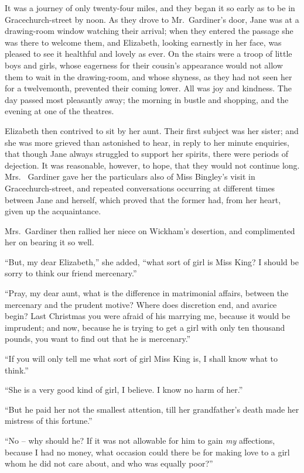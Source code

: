 It was a journey of only twenty-four miles, and they
began it so early as to be in Gracechurch-street by noon.
As they drove to Mr.\ Gardiner’s door, Jane was at a
drawing-room window watching their arrival; when they
entered the passage she was there to welcome them, and
Elizabeth, looking earnestly in her face, was pleased to see
it healthful and lovely as ever. On the stairs were a troop of
little boys and girls, whose eagerness for their cousin’s
appearance would not allow them to wait in the drawing-room,
and whose shyness, as they had not seen her for a
twelvemonth, prevented their coming lower. All was joy
and kindness. The day passed most pleasantly away;
the morning in bustle and shopping, and the evening at
one of the theatres.

Elizabeth then contrived to sit by her aunt. Their
first subject was her sister; and she was more grieved
than astonished to hear, in reply to her minute enquiries,
that though Jane always struggled to support her spirits,
there were periods of dejection. It was reasonable, however,
to hope, that they would not continue long. Mrs.\ %
Gardiner gave her the particulars also of Miss Bingley’s
visit in Gracechurch-street, and repeated conversations
occurring at different times between Jane and herself,
which proved that the former had, from her heart, given
up the acquaintance.

Mrs.\ Gardiner then rallied her niece on Wickham’s
desertion, and complimented her on bearing it so well.

“But, my dear Elizabeth,” she added, “what sort of
girl is Miss King? I should be sorry to think our friend
mercenary.”

“Pray, my dear aunt, what is the difference in matrimonial
affairs, between the mercenary and the prudent
motive? Where does discretion end, and avarice begin?
Last Christmas you were afraid of his marrying me,
because it would be imprudent; and now, because he is
trying to get a girl with only ten thousand pounds, you
want to find out that he is mercenary.”

“If you will only tell me what sort of girl Miss King is,
I shall know what to think.”

“She is a very good kind of girl, I believe. I know no
harm of her.”

“But he paid her not the smallest attention, till her
grandfather’s death made her mistress of this fortune.”

“No -- why should he? If it was not allowable for
him to gain \textit{my} affections, because I had no money, what
occasion could there be for making love to a girl whom
he did not care about, and who was equally poor?”

